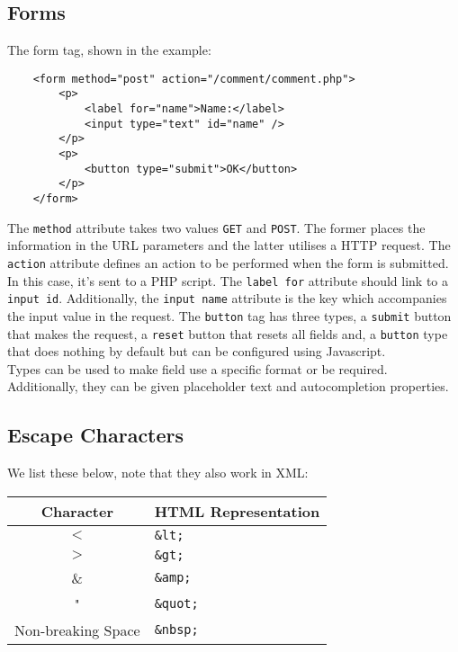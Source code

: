 \newpage

\subsection{Forms}

The form tag, shown in the example: \begin{lstlisting}
    <form method="post" action="/comment/comment.php">
        <p>
            <label for="name">Name:</label>
            <input type="text" id="name" />
        </p>
        <p>
            <button type="submit">OK</button>
        </p>
    </form>
\end{lstlisting} The \texttt{method} attribute takes two values
\texttt{GET} and \texttt{POST}. The former places the
information in the URL parameters and the latter utilises
a HTTP request. \newline
The \texttt{action} attribute defines an action to be
performed when the form is submitted. In this case,
it's sent to a PHP script. \newline
The \texttt{label for} attribute should link to a \texttt{input 
id}. Additionally, the \texttt{input name} attribute is the key
which accompanies the input value in the request. \newline
The \texttt{button} tag has three types, a \texttt{submit} button
that makes the request, a \texttt{reset} button that resets all fields and,
a \texttt{button} type that does nothing by default but can
be configured using Javascript.
\\[\baselineskip]
Types can be used to make field use a specific format or be
required. Additionally, they can be given placeholder text
and autocompletion properties.

\subsection{Escape Characters}

We list these below, note that they also work in XML:
\begin{center}
    \begin{tabular}{| c | p{5cm} |}
        \hline
        Character & HTML Representation \\
        \hline \hline
        $<$                & \texttt{\&lt;} \\
        \hline
        $>$                & \texttt{\&gt;} \\
        \hline
        \&                 & \texttt{\&amp;} \\
        \hline
        "                  & \texttt{\&quot;} \\
        \hline
        Non-breaking Space & \texttt{\&nbsp;} \\
        \hline
    \end{tabular}
\end{center}